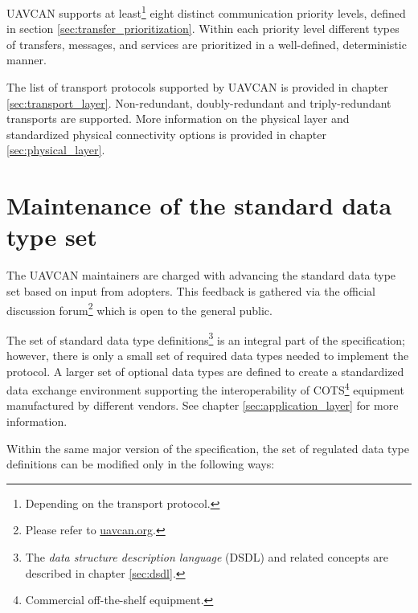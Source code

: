 UAVCAN supports at least\footnote{Depending on the transport protocol.} eight distinct communication priority levels,
defined in section \ref{sec:transfer_prioritization}.
Within each priority level different types of transfers, messages, and services are
prioritized in a well-defined, deterministic manner.

The list of transport protocols supported by UAVCAN is provided in chapter \ref{sec:transport_layer}.
Non-redundant, doubly-redundant and triply-redundant transports are supported.
More information on the physical layer and standardized physical connectivity options
is provided in chapter \ref{sec:physical_layer}.

\section{Maintenance of the standard data type set}

The UAVCAN maintainers are charged with advancing the standard data type set based on input from adopters.
This feedback is gathered via the official discussion
forum\footnote{Please refer to \href{http://uavcan.org}{uavcan.org}.}
which is open to the general public.

The set of standard data type definitions\footnote{The \emph{data structure description language} (DSDL) and
related concepts are described in chapter \ref{sec:dsdl}.} is an integral part of the specification;
however, there is only a small set of required data types needed to implement the protocol.
A larger set of optional data types are defined to create a standardized data exchange environment
supporting the interoperability of COTS\footnote{Commercial off-the-shelf equipment.}
equipment manufactured by different vendors.
See chapter \ref{sec:application_layer} for more information.

Within the same major version of the specification,
the set of regulated data type definitions can be modified only in the following ways:

